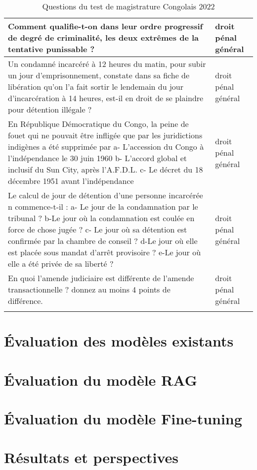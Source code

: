 \begin{longtable}{|p{}|p{}|}
\hline
Comment qualifie-t-on dans leur ordre progressif de degré de criminalité, les deux extrêmes de la tentative punissable ? & droit pénal général \\
\hline
Un condamné incarcéré à 12 heures du matin, pour subir un jour d'emprisonnement, constate dans sa fiche de libération qu'on l'a fait sortir le lendemain du jour d'incarcération à 14 heures, est-il en droit de se plaindre pour détention illégale ? & droit pénal général \\
\hline
En République Démocratique du Congo, la peine de fouet qui ne pouvait être infligée que par les juridictions indigènes a été supprimée par a- L'accession du Congo à l'indépendance le 30 juin 1960 b- L'accord global et inclusif du Sun City, après l'A.F.D.L. c- Le décret du 18 décembre 1951 avant l'indépendance & droit pénal général \\
\hline
Le calcul de jour de détention d'une personne incarcérée n commence-t-il : 
a- Le jour de la condamnation par le tribunal ? 
b-Le jour où la condamnation est coulée en force de chose jugée ? 
c- Le jour où sa détention est confirmée par la chambre de conseil ? 
d-Le jour où elle est placée sous mandat d'arrêt provisoire ? 
e-Le jour où elle a été privée de sa liberté ? & droit pénal général \\
\hline
En quoi l'amende judiciaire est différente de l'amende transactionnelle ? donnez au moins 4 points de différence. & droit pénal général \\
\hline

\caption{Questions du test de magistrature Congolais 2022}
\label{table:magisture-test-2022}
\end{longtable}


\section{Évaluation des modèles existants}
\section{Évaluation du modèle RAG}
\section{Évaluation du modèle Fine-tuning}
\section{Résultats et perspectives}
